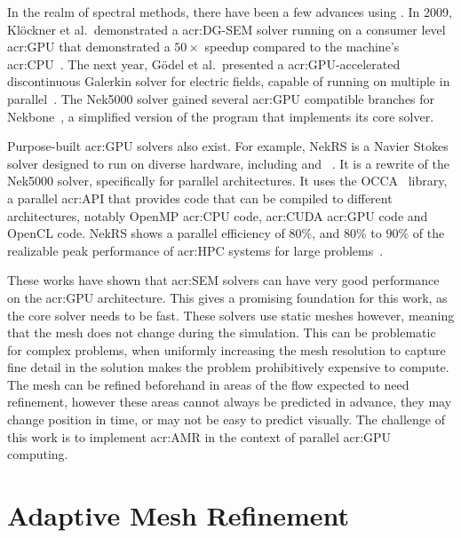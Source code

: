 In the realm of spectral methods, there have been a few advances using . In
2009, Klöckner et al.\ demonstrated a \acrshort{acr:DG-SEM} solver running on a consumer level
\acrshort{acr:GPU} that demonstrated a \(50 \times \) speedup compared to the machine's
\acrshort{acr:CPU}~\cite{Klockner2009}. The next year, Gödel et al.\ presented a
\acrshort{acr:GPU}-accelerated discontinuous Galerkin solver for electric fields, capable of running
on multiple  in parallel~\cite{Godel2010}. The Nek5000 solver gained several
\acrshort{acr:GPU} compatible branches for Nekbone~\cite{Gong2016}\cite{Chalmers2022}, a simplified
version of the program that implements its core solver.

Purpose-built \acrshort{acr:GPU} solvers also exist. For example,  NekRS is a Navier Stokes solver
designed to run on diverse hardware, including  and
~\cite{Fischer2021}. It is a rewrite of the Nek5000 solver, specifically for
parallel architectures. It uses the OCCA~\cite{Medina2014} library, a parallel \acrshort{acr:API}
that provides code that can be compiled to different architectures, notably OpenMP
\acrshort{acr:CPU} code, \acrshort{acr:CUDA} \acrshort{acr:GPU} code and OpenCL code. NekRS shows a
parallel efficiency of \(80 \% \), and \(80 \% \) to \(90 \% \) of the realizable peak performance
of \acrshort{acr:HPC} systems for large problems~\cite{Fischer2021}.

These works have shown that \acrshort{acr:SEM} solvers can have very good performance on the
\acrshort{acr:GPU} architecture. This gives a promising foundation for this work, as the core solver
needs to be fast. These solvers use static meshes however, meaning that the mesh does not change
during the simulation. This can be problematic for complex problems, when uniformly increasing the
mesh resolution to capture fine detail in the solution makes the problem prohibitively expensive to
compute. The mesh can be refined beforehand in areas of the flow expected to need refinement,
however these areas cannot always be predicted in advance, they may change position in time, or may
not be easy to predict visually. The challenge of this work is to implement \acrlong{acr:AMR} in the
context of parallel \acrshort{acr:GPU} computing.

\section{Adaptive Mesh Refinement}\label{section:literature_review:amr}

